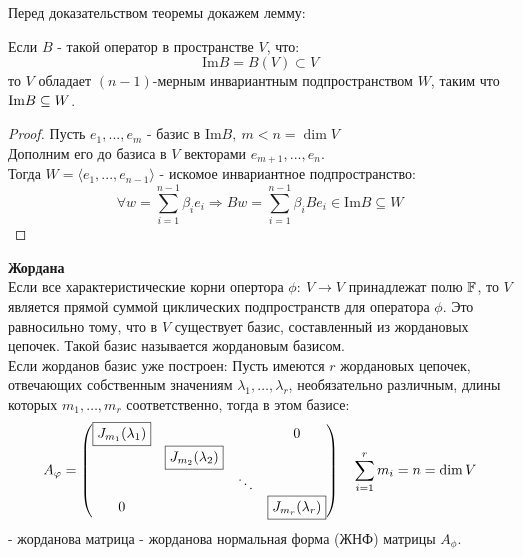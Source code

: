     Перед доказательством теоремы докажем лемму:
    \begin{lemma}
        Если $B$ - такой оператор в пространстве $V$, что: 
        $$\text{Im}B = B(V) \subset V$$
        то $V$ обладает $(n-1)$-мерным инвариантным подпространством $W$, таким что $\textup{Im}B \subseteq W$.
    \end{lemma}
    \begin{proof}
        Пусть $e_1,...,e_m$ - базис в $\text{Im}B, \ m<n = \dim V$\\
        Дополним его до базиса в $V$ векторами $e_{m+1},...,e_n$.\\
        Тогда $W = \langle e_1,...,e_{n-1} \rangle$ - искомое инвариантное подпространство:
        $$\forall w = \sum \limits_{i=1}^{n-1}\beta_ie_i \Longrightarrow Bw = \sum \limits_{i=1}^{n-1}\beta_iBe_i \in \text{Im}B \subseteq W$$
    \end{proof}
    \begin{theorem} \textbf{Жордана} \\
        \tab[0.5cm]Если все характеристические корни опертора $\phi: \ V \to V$ принадлежат полю $\mathbb{F}$, то $V$ является прямой суммой циклических подпространств для оператора $\phi$. Это равносильно тому, что в $V$ существует базис, составленный из жордановых цепочек. Такой базис называется жордановым базисом.\\
        \tab[0.5cm]Если жорданов базис уже построен: Пусть имеются $r$ жордановых цепочек, отвечающих собственным значениям $\lambda_1, \ldots, \lambda_r$, необязательно различным, длины которых $m_1,\ldots,m_r$ соответственно, тогда в этом базисе:
        $$A_{\phi} = \begin{pmatrix}
        \text{\fbox{$J_{m_1}(\lambda_1)$}} & \null & \null & 0 \\
        \null & \text{\fbox{$J_{m_2}(\lambda_2)$}}\\
        \null & \null & \ddots\\
        0 & \null & \null & \text{\fbox{$J_{m_r}(\lambda_r)$}}\\
        \end{pmatrix} \ \ \ \sum \limits_{i=1}^rm_i = n = \dim V$$ 
        - жорданова матрица - жорданова нормальная форма (ЖНФ) матрицы $A_{\phi}$.
    \end{theorem}
